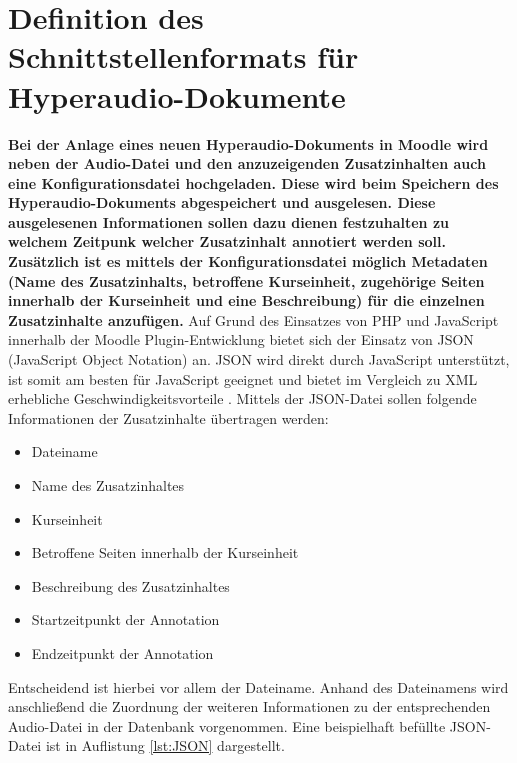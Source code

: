 \section{Definition des Schnittstellenformats für Hyperaudio-Dokumente}
\label{sec:konfigurationsdatei}
\textbf{Bei der Anlage eines neuen Hyperaudio-Dokuments in Moodle wird neben der Audio-Datei und den anzuzeigenden Zusatzinhalten auch eine Konfigurationsdatei hochgeladen. Diese wird beim Speichern des Hyperaudio-Dokuments abgespeichert und ausgelesen. Diese ausgelesenen Informationen sollen dazu dienen festzuhalten zu welchem Zeitpunk welcher Zusatzinhalt annotiert werden soll. Zusätzlich ist es mittels der Konfigurationsdatei möglich Metadaten (Name des Zusatzinhalts, betroffene Kurseinheit, zugehörige Seiten innerhalb der Kurseinheit und eine Beschreibung) für die einzelnen Zusatzinhalte anzufügen.}
Auf Grund des Einsatzes von PHP und JavaScript innerhalb der Moodle Plugin-Entwicklung bietet sich der Einsatz von JSON (JavaScript Object Notation) an. JSON wird direkt durch JavaScript unterstützt, ist somit am besten für JavaScript geeignet und bietet im Vergleich zu XML erhebliche Geschwindigkeitsvorteile \citep{nurseitov2009comparison}.
Mittels der JSON-Datei sollen folgende Informationen der Zusatzinhalte übertragen werden:

\begin{itemize}
\item Dateiname
\item Name des Zusatzinhaltes
\item Kurseinheit
\item Betroffene Seiten innerhalb der Kurseinheit
\item Beschreibung des Zusatzinhaltes
\item Startzeitpunkt der Annotation
\item Endzeitpunkt der Annotation
\end{itemize}

Entscheidend ist hierbei vor allem der Dateiname. Anhand des Dateinamens wird anschließend die Zuordnung der weiteren Informationen zu der entsprechenden Audio-Datei in der Datenbank vorgenommen. Eine beispielhaft befüllte JSON-Datei ist in Auflistung \ref{lst:JSON} dargestellt.

